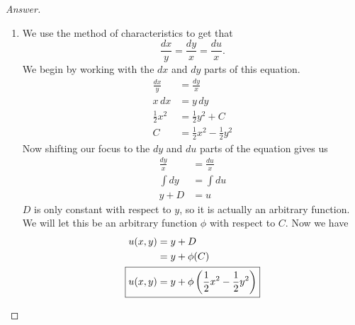 \documentclass{article}
\theoremstyle{definition}
\renewcommand\qedsymbol{$\blacksquare$}
\newenvironment{ans}{\begin{proof}[Answer]\renewcommand{\qedsymbol}{}}{\end{proof}}
\begin{document}
\begin{ans}
\begin{enumerate}[resume*=answers]
			\item We use the method of characteristics to get that
            \[\frac{dx}{y} = \frac{dy}{x} = \frac{du}{x}.\]
            We begin by working with the $dx$ and $dy$ parts of this equation.
            \begin{align*}
                \frac{dx}{y} &= \frac{dy}{x}\\
                x\, dx &= y\, dy\\
                \frac{1}{2}x^2 &= \frac{1}{2}y^2 + C \tag{after integrating}\\
                C &= \frac{1}{2}x^2 - \frac{1}{2}y^2
            \end{align*}
            Now shifting our focus to the $dy$ and $du$ parts of the equation gives us
            \begin{align*}
                \frac{dy}{x} &= \frac{du}{x}\\
                \int dy &= \int du\\
                y + D &= u
            \end{align*}
            $D$ is only constant with respect to $y$, so it is actually an arbitrary function. We will let this be an arbitrary function $\phi$ with respect to $C$. Now we have
            \begin{align*}
                u(x,y) &= y + D\\
                &= y + \phi(C)\\
                \Aboxed{u(x,y) &= y + \phi\left(\frac{1}{2}x^2 - \frac{1}{2}y^2\right)}
            \end{align*}
            

\end{enumerate}
\end{ans}
\end{document}
